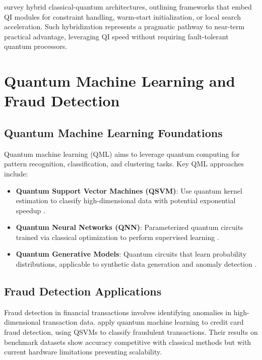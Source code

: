 \documentclass[12pt]{article}
\numberwithin{equation}{section}
\begin{document}
\citet{HybridSurvey2024} survey hybrid classical-quantum architectures, outlining frameworks that embed QI modules for constraint handling, warm-start initialization, or local search acceleration. Such hybridization represents a pragmatic pathway to near-term practical advantage, leveraging QI speed without requiring fault-tolerant quantum processors.

\section{Quantum Machine Learning and Fraud Detection}
\label{sec:ml_fraud}

\subsection{Quantum Machine Learning Foundations}

Quantum machine learning (QML) aims to leverage quantum computing for pattern recognition, classification, and clustering tasks. Key QML approaches include:

\begin{itemize}[leftmargin=*]
\item \textbf{Quantum Support Vector Machines (QSVM)}: Use quantum kernel estimation to classify high-dimensional data with potential exponential speedup \citep{Rebentrost2014QSVM}.
\item \textbf{Quantum Neural Networks (QNN)}: Parameterized quantum circuits trained via classical optimization to perform supervised learning \citep{Farhi2018QNN}.
\item \textbf{Quantum Generative Models}: Quantum circuits that learn probability distributions, applicable to synthetic data generation and anomaly detection \citep{Benedetti2019QGAN}.
\end{itemize}

\subsection{Fraud Detection Applications}

Fraud detection in financial transactions involves identifying anomalies in high-dimensional transaction data. \citet{Liu2022QMLFraud} apply quantum machine learning to credit card fraud detection, using QSVMs to classify fraudulent transactions. Their results on benchmark datasets show accuracy competitive with classical methods but with current hardware limitations preventing scalability.
\end{document}
